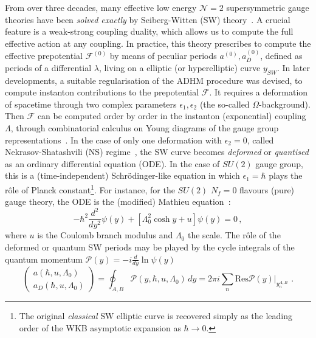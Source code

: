 \documentclass[11pt,a4paper]{elsarticle}
\newcommand{\be}{\begin{equation}}
\newcommand{\ee}{\end{equation}}
\numberwithin{figure}{section}
\numberwithin{table}{section}
\begin{document}
From over three decades, many effective low energy $\mathcal{N}=2$ supersymmetric gauge theories have been \textit{solved exactly} by Seiberg-Witten (SW) theory~\cite{SeibergWitten:1994pure,SeibergWitten:1994QCD}. A crucial feature is a weak-strong coupling duality, which allows us to compute the full effective action at any coupling. In practice, this theory prescribes to compute the effective prepotential $\mathcal{F}^{(0)}$ by means of peculiar periods $a^{(0)},a^{(0)}_D$, defined as periods of a differential $\lambda$, living on a elliptic (or hyperelliptic) curve $y_{SW}$. In later developments, a suitable regularisation of the ADHM procedure \cite{ADHM} was devised, to compute instanton contributions to the prepotential $\mathcal{F}$. It requires a deformation of spacetime through two complex parameters $\epsilon_1,\epsilon_2$ (the so-called $\Omega$-background). Then $\mathcal{F}$ can be computed order by order in the instanton (exponential) coupling $\Lambda$, through combinatorial calculus on Young diagrams of the gauge group representations~\cite{Flume:2002az,Nekrasov2003,NekrasovOkounkov:2003,NekrasovOkounkov2006}. In the case of only one deformation with $\epsilon_2=0$, called Nekrasov-Shatashvili (NS) regime~\cite{NekrasovShatashvili:2009}, the SW curve becomes \textit{deformed} or \textit{quantised} as an ordinary differential equation (ODE). In the case of $SU(2)$ gauge group, this is a (time-independent) Schr\"odinger-like equation in which $\epsilon_1=\hbar$ plays the r\^{o}le of Planck constant\footnote{The original \textit{classical} SW elliptic curve is recovered simply as the leading order of the WKB asymptotic expansion as $\hbar \to 0$.}. For instance, for the $SU(2)$ $N_f=0$ flavours (pure) gauge theory, the ODE is the (modified) Mathieu equation~\cite{MironovMorozov:2009,BasarDunne:2015,Kashani-PoorTroost:2015}:
\be \label{ODE0}
- \hbar^2  \frac{d^2}{dy^2} \psi(y) + [\Lambda_0^2 \cosh y + u ] \psi(y) = 0\,,
\ee
where $u$ is the Coulomb branch modulus and $\Lambda_0$ the scale. The r\^ole of the deformed or quantum SW periods may be played by the cycle integrals of the quantum momentum $\mathcal{P}(y)= - i \frac{d}{dy} \ln \psi(y)$~\cite{MironovMorozov:2009}
\begin{equation} \label{qperint}
\begin{pmatrix}a(\hbar,u, \Lambda_0)\\ a_D(\hbar,u, \Lambda_0)
\end{pmatrix}= \oint_{A,B} \mathcal{P}(y,\hbar, u, \Lambda_0)\, d y =2\pi i\sum_{n}\text{Res}\mathcal{P}(y)\biggr |_{y_n^{A,B}}\,\, . 
 \end{equation} 
\end{document}
